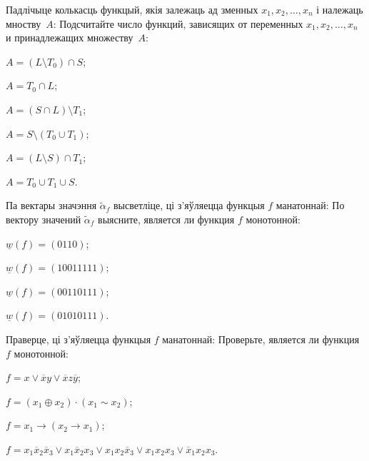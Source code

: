 \documentclass[12pt, a4paper]{article}
\begin{document}
\begin{problemList}
\problemItemWithCommonPart
{Падлічыце колькасць функцый, якія залежаць ад зменных $x_1, x_2, \ldots, x_n$ і належаць мноству~$A$:}
{Подсчитайте число функций, зависящих от переменных $x_1, x_2, \ldots, x_n$ и принадлежащих множеству~$A$:}
{%
\begin{belarusianEnumerateTwocol}
    \item $A=(L\setminus T_0)\cap S$;
    \item $A=T_0\cap L$;
    \item $A=(S\cap L)\setminus T_1$;
    \item $A=S\setminus(T_0\cup T_1)$;
    \item $A=(L\setminus S)\cap T_1$;
    \item $A=T_0 \cup T_1 \cup S$.
\end{belarusianEnumerateTwocol}
}

\smallskip

\problemItemWithCommonPart
{Па вектары значэння $\tilde\alpha_f$ высветліце, ці з'яўляецца функцыя $f$ манатоннай:}
{По вектору значений $\tilde\alpha_f$ выясните, является ли функция $f$ монотонной:}
{%
\begin{belarusianEnumerateTwocol}
    \item $\underline{w}(f)=(0110)$;
    \item $\underline{w}(f)=(10011111)$;
    \item $\underline{w}(f)=(00110111)$;
    \item $\underline{w}(f)=(01010111)$.
\end{belarusianEnumerateTwocol}
}

\smallskip

\problemItemWithCommonPart
{Праверце, ці з'яўляецца функцыя $f$ манатоннай:}
{Проверьте, является ли функция $f$ монотонной:}
{%
\begin{belarusianEnumerate}
    \item $f=x\vee \overline{x}y\vee\overline{x}z\overline{y}$;
    \item $f=(x_1\oplus x_2)\cdot(x_1\sim x_2)$;
    \item $f=x_1\rightarrow (x_2 \rightarrow x_1)$;
    \item $f=x_1\overline{x}_2\overline{x}_3\vee x_1\overline{x}_2x_3\vee x_1x_2\overline{x}_3\vee x_1x_2x_3\vee \overline{x}_1x_2x_3$.
\end{belarusianEnumerate}
}

\smallskip


\end{problemList}
\end{document}
